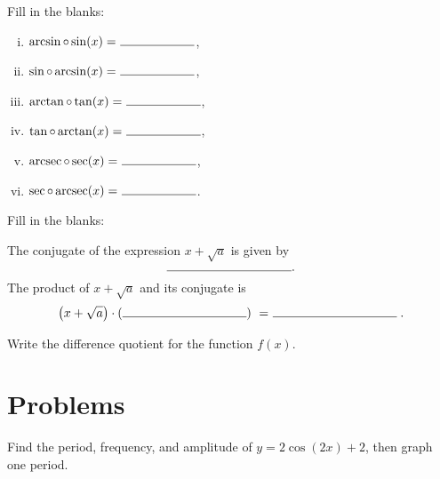 \documentclass[12pt]{amsart}
\begin{document}
\begin{thm}[6 Points]
  Fill in the blanks:
  \vspace{.15in}
  \begin{multicols}{2}
    \begin{enumerate}[(i)]
    \item
      $\displaystyle{\arcsin \circ \sin(x) =\ \line(1,0){60}}$,
      \vspace{.15in}
    \item
      $\displaystyle{\sin \circ \arcsin(x) =\ \line(1,0){60}}$,
      \vspace{.15in}
    \item
      $\displaystyle{\arctan \circ \tan(x) =\ \line(1,0){60}}$,
      \vspace{.15in}
    \item
      $\displaystyle{\tan \circ \arctan(x) =\ \line(1,0){60}}$,
      \vspace{.15in}
    \item
      $\displaystyle{\operatorname{arcsec} \circ \sec(x) =\ \line(1,0){60}}$,
      \vspace{.15in}
    \item
      $\displaystyle{\sec \circ \operatorname{arcsec}(x) =\ \line(1,0){60}}$.
    \end{enumerate}
  \end{multicols}
\end{thm}

\begin{thm}[1 Point]
  Fill in the blanks:
  \begin{center}
    The conjugate of the expression $x + \sqrt{a}$ is given by 
    \vspace{.15in}
    $$\line(1,0){100}.$$
    The product of $x + \sqrt{a}$ and its conjugate is
    \vspace{.15in}
    $$\left(x + \sqrt{a}\right) \cdot \left(\line(1,0){100}\right)\ =\ \line(1,0){100}.$$
  \end{center}
\end{thm}

\begin{thm}[1 Point]
  Write the difference quotient for the function $f(x)$.
\end{thm}
\newpage

\section{Problems}
\setcounter{thm}{0}
\begin{thm}[8 Points]\label{ex1}
  Find the period, frequency, and amplitude of $y = 2\cos(2x) + 2$, then graph one period.
\end{thm}
\end{document}
